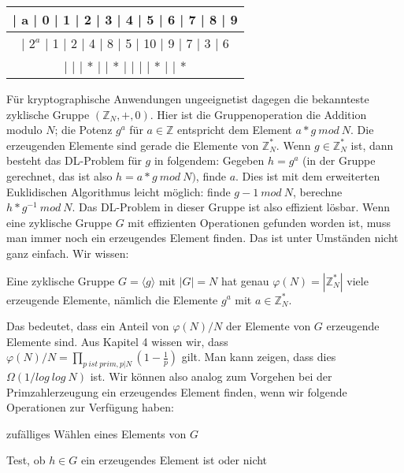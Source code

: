 \documentclass[a4paper]{article}
\begin{document}
\begin{multicols}{3}
        \begin{tabular}{c}
            | a   | 0  | 1  | 2  | 3  | 4  | 5  | 6  | 7  | 8  | 9   \\\hline
            | $2^a$ | 1  | 2  | 4  | 8  | 5  | 10 | 9  | 7  | 3  | 6 \\
            |    |   | *  |   | *  |   |   |   | *  |   | *
        \end{tabular}

        Für kryptographische Anwendungen ungeeignetist dagegen die bekannteste zyklische Gruppe $(\mathbb{Z}_N,+,0)$. Hier ist die Gruppenoperation die Addition modulo $N$; die Potenz $g^a$ für $a\in\mathbb{Z}$ entspricht dem Element $a*g\ mod\ N$. Die erzeugenden Elemente sind gerade die Elemente von $\mathbb{Z}^*_N$. Wenn $g\in\mathbb{Z}^*_N$ ist, dann besteht das DL-Problem für $g$ in folgendem: Gegeben $h=g^a$ (in der Gruppe gerechnet, das ist also $h=a*g\ mod\ N)$, finde $a$. Dies ist mit dem erweiterten Euklidischen Algorithmus leicht möglich: finde $g-1\ mod\ N$, berechne $h*g^{-1}\ mod\ N$. Das DL-Problem in dieser Gruppe ist also effizient lösbar.
        Wenn eine zyklische Gruppe $G$ mit effizienten Operationen gefunden worden ist, muss man immer noch ein erzeugendes Element finden. Das ist unter Umständen nicht ganz einfach. Wir wissen:
        \begin{itemize*}
            \item Eine zyklische Gruppe $G=\langle g\rangle $ mit $|G|=N$ hat genau $\varphi(N) = |\mathbb{Z}^*_N|$ viele erzeugende Elemente, nämlich die Elemente $g^a$ mit $a\in\mathbb{Z}^*_N$.
        \end{itemize*}

        Das bedeutet, dass ein Anteil von $\varphi(N)/N$ der Elemente von $G$ erzeugende Elemente sind. Aus Kapitel 4 wissen wir, dass $\varphi(N)/N=\prod_{p\ ist\ prim, p|N}(1-\frac{1}{p})$ gilt. Man kann zeigen, dass dies $\Omega(1/log\ log\ N)$ ist. Wir können also analog zum Vorgehen bei der Primzahlerzeugung ein erzeugendes Element finden, wenn wir folgende Operationen zur Verfügung haben:
        \begin{itemize*}
            \item zufälliges Wählen eines Elements von $G$
            \item Test, ob $h\in G$ ein erzeugendes Element ist oder nicht
        \end{itemize*}


\end{multicols}
\end{document}
